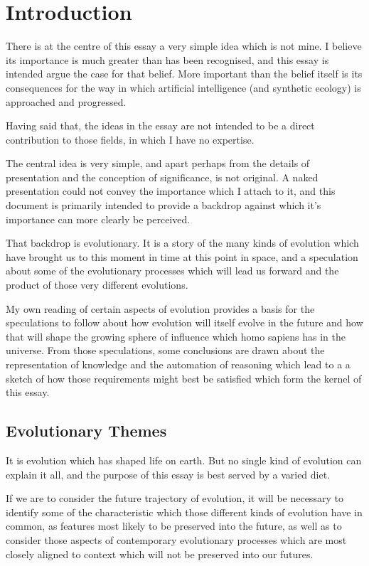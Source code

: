 \documentclass[10pt,titlepage]{article}
\begin{document}
\section{Introduction}

There is at the centre of this essay a very simple idea which is not mine.
I believe its importance is much greater than has been recognised, and this essay is intended argue the case for that belief.
More important than the belief itself is its consequences for the way in which artificial intelligence (and synthetic ecology) is approached and progressed.

Having said that, the ideas in the essay are not intended to be a direct contribution to those fields, in which I have no expertise.

The central idea is very simple, and apart perhaps from the details of presentation and the conception of significance, is not original.
A naked presentation could not convey the importance which I attach to it, and this document is primarily intended to provide a backdrop against which it's importance can more clearly be perceived.

That backdrop is evolutionary.
It is a story of the many kinds of evolution which have brought us to this moment in time at this point in space, and a speculation about some of the evolutionary processes which will lead us forward and the product of those very different evolutions.

My own reading of certain aspects of evolution provides a basis for the speculations to follow about how evolution will itself evolve in the future and how that will shape the growing sphere of influence which homo sapiens has in the universe.
From those speculations, some conclusions are drawn about the representation of knowledge and the automation of reasoning which lead to a a sketch of how those requirements might best be satisfied which form the kernel of this essay.

\subsection{Evolutionary Themes}

It is evolution which has shaped life on earth.
But no single kind of evolution can explain it all, and the purpose of this essay is best served by a varied diet.

If we are to consider the future trajectory of evolution, it will be necessary to identify some of the characteristic which those different kinds of evolution have in common, as features most likely to be preserved into the future, as well as to consider those aspects of contemporary evolutionary processes which are most closely aligned to context which will not be preserved into our futures.
\end{document}
